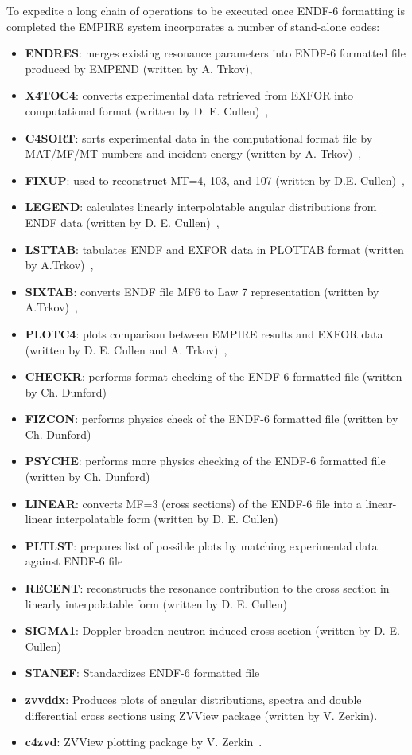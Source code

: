 \documentclass[twocolumn,amsmath,amssymb,10pt,groupedaddress,letter]{revtex4}
\begin{document}
To expedite a long chain of operations to be executed once ENDF-6 formatting is completed
the EMPIRE system incorporates a number of stand-alone codes:
\begin{itemize}
\item \textbf{ENDRES}: merges existing resonance parameters
into ENDF-6 formatted file produced by EMPEND (written by A. Trkov),
\item \textbf{X4TOC4}: converts experimental data retrieved
from EXFOR into computational format (written by D. E. Cullen)~\cite{PREPRO},
\item \textbf{C4SORT}: sorts experimental data in the computational
format file by MAT/MF/MT numbers and incident energy (written by A. Trkov)~\cite{ENDVER},
\item \textbf{FIXUP}: used to reconstruct MT=4, 103, and
107 (written by D.E. Cullen)~\cite{PREPRO},
\item \textbf{LEGEND}: calculates linearly interpolatable
angular distributions from ENDF data (written by D. E. Cullen)~\cite{PREPRO},
\item \textbf{LSTTAB}: tabulates ENDF and EXFOR data in
PLOTTAB format (written by A.Trkov)~\cite{ENDVER},
\item \textbf{SIXTAB}: converts ENDF file MF6 to Law 7 representation
(written by A.Trkov)~\cite{ENDVER},
\item \textbf{PLOTC4}: plots comparison between EMPIRE results
and EXFOR data (written by D. E. Cullen and A. Trkov)~\cite{ENDVER},
\item \textbf{CHECKR}: performs format checking of the ENDF-6
formatted file (written by Ch. Dunford)
\item \textbf{FIZCON}: performs physics check of the ENDF-6 formatted file
(written by Ch. Dunford)
\item \textbf{PSYCHE}: performs more physics checking of the ENDF-6 formatted
file (written by Ch. Dunford)
\item \textbf{LINEAR}: converts MF=3 (cross sections) of the ENDF-6 file
into a linear-linear interpolatable form (written by D. E. Cullen)~\cite{PREPRO}
\item \textbf{PLTLST}: prepares list of possible plots by matching experimental
data against ENDF-6 file
\item \textbf{RECENT}: reconstructs the resonance contribution to the cross
section in linearly interpolatable form (written by D. E. Cullen)~\cite{PREPRO}
\item \textbf{SIGMA1}: Doppler broaden neutron induced cross section (written
by D. E. Cullen)~\cite{PREPRO}
\item \textbf{STANEF}: Standardizes ENDF-6 formatted file
\item \textbf{zvvddx}: Produces plots of angular distributions, spectra
and double differential cross sections using ZVView package (written
by V. Zerkin).
\item \textbf{c4zvd}: ZVView\textbf{} plotting package by
V. Zerkin~\cite{ZVView}.
\end{itemize}
\end{document}
